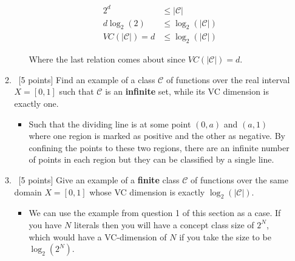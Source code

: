 \begin{enumerate}
\begin{enumerate}
\begin{itemize}
\begin{align*}
2^{d} &\leq \left| \mathcal{C}\right|\\
d\log_{2}(2) &\leq \log_{2}(\left| \mathcal{C}\right|)\\
VC(\left| \mathcal{C}\right|) = d &\leq \log_{2}(\left| \mathcal{C}\right| )
\end{align*}

Where the last relation comes about since $VC(\left| \mathcal{C}\right|) = d$.
\end{itemize}
  \item ~[5 points] Find an example of a class $\mathcal{C}$ of
    functions over the real interval $X = [0,1]$ such that
    $\mathcal{C}$ is an {\bf infinite} set, while its VC dimension is
    exactly one.


\begin{itemize}
\item Such that the dividing line is at some point $(0,a)$ and $(a,1)$ where one region is marked as positive and the other as negative. By confining the points to these two regions, there are an infinite number of points in each region but they can be classified by a single line.
\end{itemize}
  \item ~[5 points] Give an example of a {\bf finite} class
    $\mathcal{C}$ of functions over the same domain $X = [0,1]$ whose
    VC dimension is exactly $\log_2(|\mathcal{C}|)$.

\begin{itemize}
\item We can use the example from question 1 of this section as a case. If you have $N$ literals then you will have a concept class size of $2^{N}$, which would have a VC-dimension of $N$ if you take the size to be $\log_{2}\left( 2^{N}\right)$.
\end{itemize}

  \end{enumerate}
  
\end{enumerate}

